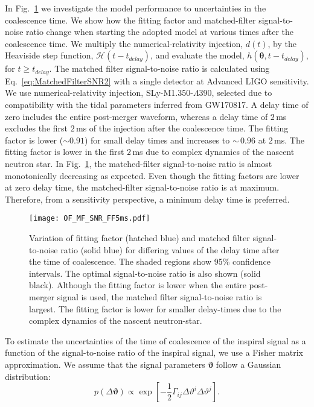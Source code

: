 \documentclass[../Thesis.tex]{subfiles}
\begin{document}
     In Fig.~\ref{fig:OF_MF_SNR_FF5ms} we investigate the model performance to uncertainties in the coalescence time.
     We show how the fitting factor and matched-filter signal-to-noise ratio change when starting the adopted model at various times after the coalescence time.
     We multiply the numerical-relativity injection, $d(t)$, by the Heaviside step function, $\mathcal{H}(t-t_{delay})$, and evaluate the model, $h(\boldsymbol{\theta},t-t_{delay})$, for $t \geq t_{delay}$.
     The matched filter signal-to-noise ratio is calculated using Eq.~\ref{eq:MatchedFilterSNR2} with a single detector at Advanced LIGO sensitivity.
     We use numerical-relativity injection, SLy-M1.350-$\Lambda$390, selected due to compatibility with the tidal parameters inferred from GW170817.
     A delay time of zero includes the entire post-merger waveform, whereas a delay time of $2\,$ms excludes the first $2\,$ms of the injection after the coalescence time. 
     The fitting factor is lower ($\sim 0.91$) for small delay times and increases to $\sim\,0.96$ at $2\,$ms. 
     The fitting factor is lower in the first $2\,$ms due to complex dynamics of the nascent neutron star.
     In Fig.~\ref{fig:OF_MF_SNR_FF5ms}, the matched-filter signal-to-noise ratio is almost monotonically decreasing as expected. 
     Even though the fitting factors are lower at zero delay time, the matched-filter signal-to-noise ratio is at maximum. 
     Therefore, from a sensitivity perspective, a minimum delay time is preferred.
\begin{figure}[H]
         \centering
         \texttt{[image: OF\_MF\_SNR\_FF5ms.pdf]}
         \caption{Variation of fitting factor (hatched blue) and matched filter  signal-to-noise ratio (solid blue) for differing values of the delay time after the time of coalescence. The shaded regions show 95\% confidence intervals. The optimal signal-to-noise ratio is also shown (solid black). Although the fitting factor is lower when the entire post-merger signal is used, the matched filter signal-to-noise ratio is largest. The fitting factor is lower for smaller delay-times due to the complex dynamics of the nascent neutron-star.}
     \label{fig:OF_MF_SNR_FF5ms}
     \end{figure}  
     To estimate the uncertainties of the time of coalescence of the inspiral signal as a function of the signal-to-noise ratio of the inspiral signal, we use a Fisher matrix approximation. 
     We assume that the signal parameters $\boldsymbol{\vartheta}$ follow a Gaussian distribution: 
\begin{equation}
    p \left( \Delta \boldsymbol{\vartheta} \right) \propto \exp \left[-\frac{1}{2}\Gamma_{ij}\Delta \vartheta^i \Delta \vartheta^j\right].
\end{equation}
\end{document}
